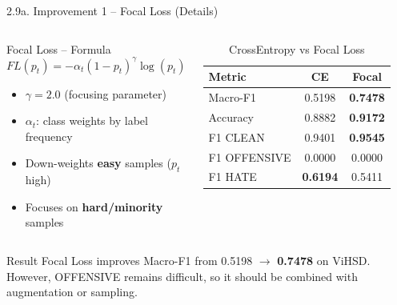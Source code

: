 \documentclass[11pt, aspectratio=169]{beamer}
\begin{document}
\begin{frame}[shrink=8]{2.9a. Improvement 1 -- Focal Loss (Details)}

\begin{columns}[T]
  \begin{block}{Focal Loss -- Formula}
    $$FL(p_t) = -\alpha_t (1-p_t)^\gamma \log(p_t)$$
    \begin{itemize}
      \item $\gamma = 2.0$ (focusing parameter)
      \item $\alpha_t$: class weights by label frequency
      \item Down-weights \textbf{easy} samples ($p_t$ high)
      \item Focuses on \textbf{hard/minority} samples
    \end{itemize}
  \end{block}

  \begin{table}[h]
    \centering
    \caption{CrossEntropy vs Focal Loss}
    \vspace{0.1cm}
    \scriptsize
    \begin{tabular}{lcc}
      \toprule
      \textbf{Metric} & \textbf{CE} & \textbf{Focal} \\
      \midrule
      Macro-F1 & 0.5198 & \textbf{0.7478} \\
      Accuracy & 0.8882 & \textbf{0.9172} \\
      F1 CLEAN & 0.9401 & \textbf{0.9545} \\
      F1 OFFENSIVE & 0.0000 & 0.0000 \\
      F1 HATE & \textbf{0.6194} & 0.5411 \\
      \bottomrule
    \end{tabular}
  \end{table}
\end{columns}

\vspace{0.2cm}
\begin{block}{Result}
  Focal Loss improves Macro-F1 from 0.5198 $\rightarrow$ \textbf{0.7478} on ViHSD. However, OFFENSIVE remains difficult, so it should be combined with augmentation or sampling.
\end{block}
\end{frame}
\end{document}
